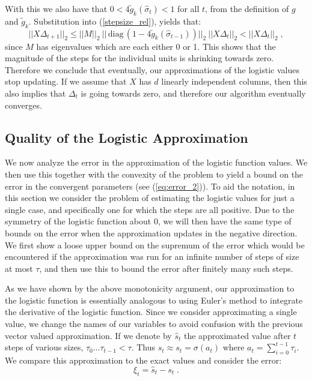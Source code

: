 \documentclass[11pt]{article}
\begin{document}
With this we also have that $0 < 4\tilde{g}_k(\hat{\sigma}_t) < 1$ for all $t$, from the definition of $g$ and $\tilde{g}_k$.  Substitution into (\ref{stepsize_rel}), yields that:
\begin{equation}\label{approx_sigma_bound}
||X\Delta_{t+1}||_2 \leq ||M||_2\ ||\,\text{diag}\,(1-4\tilde{g}_k(\hat{\sigma}_{t-1}))||_2\ ||X\Delta_t||_2 < ||X\Delta_t||_2 \; ,
\end{equation}
since $M$ has eigenvalues which are each either 0 or 1.  This shows that the magnitude of the steps for the individual units is shrinking towards zero.  Therefore we  conclude that eventually, our approximations of the logistic values stop updating.  If we assume that $X$ has $d$ linearly independent columns, then this also implies that $\Delta_t$ is going towards zero, and therefore our algorithm eventually converges.

\subsection{Quality of the Logistic Approximation}\label{sec:p2error}

We now analyze the error in the approximation of the logistic function values.  We then use this together with  the convexity of the problem to  yield a bound on the error in the convergent parameters (see (\ref{eq:error_2})).  To aid the notation, in this section we consider the problem of estimating the logistic values for just a single case, and specifically one for which the steps are all positive.  Due to the symmetry of the logistic function about 0, we will then have the same type of bounds on the error when the approximation updates in the negative direction.  We first show a loose upper bound on the supremum of the error which would be encountered if the approximation was run for an infinite number of steps of size at most $\tau$, and then use this to bound the error after finitely many such steps.

As we have shown by the above monotonicity argument, our approximation to the logistic function is essentially analogous to using Euler's method to integrate the derivative of the logistic function.  Since we consider approximating a single value, we change the names of our variables to avoid confusion with the previous vector valued approximation.  If we denote by $\hat{s}_t$ the approximated value after $t$ steps of various sizes,  $\tau_0\ldots \tau_{t-1} < \tau$.  Thus  $\hat{s}_t \approx s_t = \sigma(a_t)$ where $a_t = \sum_{i=0}^{t-1}\tau_i$. We  compare this approximation to the exact values and consider the error:
$$\xi_t = \hat{s}_{t} - s_{t} \; .$$
\end{document}
